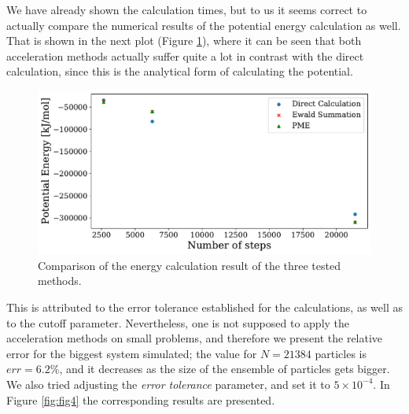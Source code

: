 \documentclass[a4paper, 12pt, notitlepage]{article}
\begin{document}
We have already shown the calculation times, but to us it seems correct to actually compare the numerical results of the potential energy calculation as well. That is shown in the next plot (Figure \ref{fig:fig3}), where it can be seen that both acceleration methods actually suffer quite a lot in contrast with the direct calculation, since this is the analytical form of calculating the potential.
\begin{figure}
	\centering
	\includegraphics[scale=0.5]{./Figures/plot2.pdf}
	\caption{Comparison of the energy calculation result of the three tested methods.}\label{fig:fig3}
\end{figure}
This is attributed to the error tolerance established for the calculations, as well as to the cutoff parameter. Nevertheless, one is not supposed to apply the acceleration methods on small problems, and therefore we present the relative error for the biggest system simulated; the value for $N = 21384$ particles is $err = 6.2$\%, and it decreases as the size of the ensemble of particles gets bigger. We also tried adjusting the \textit{error tolerance} parameter, and set it to $5\times 10^{-4}$. In Figure \ref{fig:fig4} the corresponding results are presented.
\end{document}
